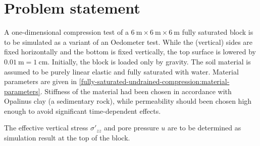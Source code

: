 \section{Problem statement}

A one-dimensional compression test of a $\SI{6}{\metre} \times \SI{6}{\metre}
    \times \SI{6}{\metre}$ fully saturated block is to be simulated as a variant of
an Oedometer test. While the (vertical) sides are fixed horizontally and the
bottom is fixed vertically, the top surface is lowered by
$\SI{0.01}{\metre}=\SI{1}{\centi\metre}$. Initially, the block is loaded only
by gravity. The soil material is assumed to be purely linear elastic and fully
saturated with water. Material parameters are given in
\autoref{fully-saturated-undrained-compression:material-parameters}. Stiffness
of the material had been chosen in accordance with Opalinus clay (a sedimentary
rock), while permeability should been chosen high enough to avoid significant
time-dependent effects.

The effective vertical stress $\sigma'_{zz}$ and pore pressure $u$ are to be
determined as simulation result at the top of the block.

